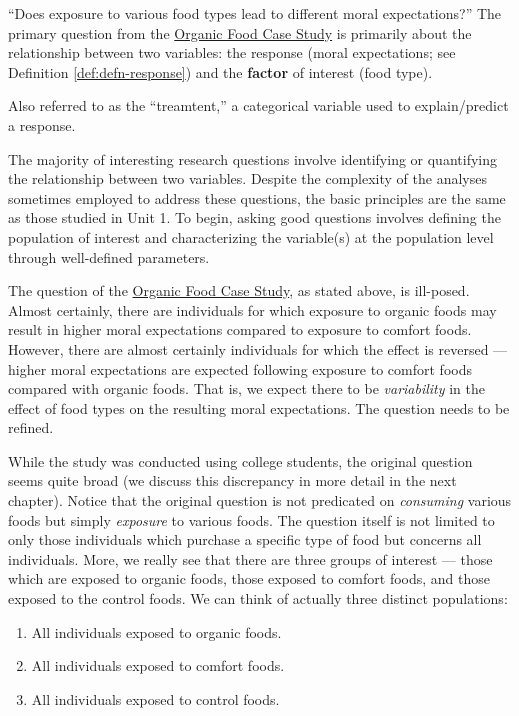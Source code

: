 \documentclass[]{book}
\providecommand{\tightlist}{%
  \setlength{\itemsep}{0pt}\setlength{\parskip}{0pt}}
\theoremstyle{definition}
\theoremstyle{definition}
\theoremstyle{definition}
\theoremstyle{remark}
\let\BeginKnitrBlock\begin \let\EndKnitrBlock\end
\begin{document}
``Does exposure to various food types lead to different moral
expectations?'' The primary question from the
\protect\hyperlink{CaseOrganic}{Organic Food Case Study} is primarily
about the relationship between two variables: the response (moral
expectations; see Definition \ref{def:defn-response}) and the
\textbf{factor} of interest (food type).

\BeginKnitrBlock{definition}[Factor]
\protect\hypertarget{def:defn-factor}{}{\label{def:defn-factor}
{} }Also referred to as the ``treamtent,'' a
categorical variable used to explain/predict a response.
\EndKnitrBlock{definition}

The majority of interesting research questions involve identifying or
quantifying the relationship between two variables. Despite the
complexity of the analyses sometimes employed to address these
questions, the basic principles are the same as those studied in Unit 1.
To begin, asking good questions involves defining the population of
interest and characterizing the variable(s) at the population level
through well-defined parameters.

The question of the \protect\hyperlink{CaseOrganic}{Organic Food Case
Study}, as stated above, is ill-posed. Almost certainly, there are
individuals for which exposure to organic foods may result in higher
moral expectations compared to exposure to comfort foods. However, there
are almost certainly individuals for which the effect is reversed ---
higher moral expectations are expected following exposure to comfort
foods compared with organic foods. That is, we expect there to be
\emph{variability} in the effect of food types on the resulting moral
expectations. The question needs to be refined.

While the study was conducted using college students, the original
question seems quite broad (we discuss this discrepancy in more detail
in the next chapter). Notice that the original question is not
predicated on \emph{consuming} various foods but simply \emph{exposure}
to various foods. The question itself is not limited to only those
individuals which purchase a specific type of food but concerns all
individuals. More, we really see that there are three groups of interest
--- those which are exposed to organic foods, those exposed to comfort
foods, and those exposed to the control foods. We can think of actually
three distinct populations:

\begin{enumerate}
\def\labelenumi{\arabic{enumi}.}
\tightlist
\item
  All individuals exposed to organic foods.
\item
  All individuals exposed to comfort foods.
\item
  All individuals exposed to control foods.
\end{enumerate}
\end{document}
